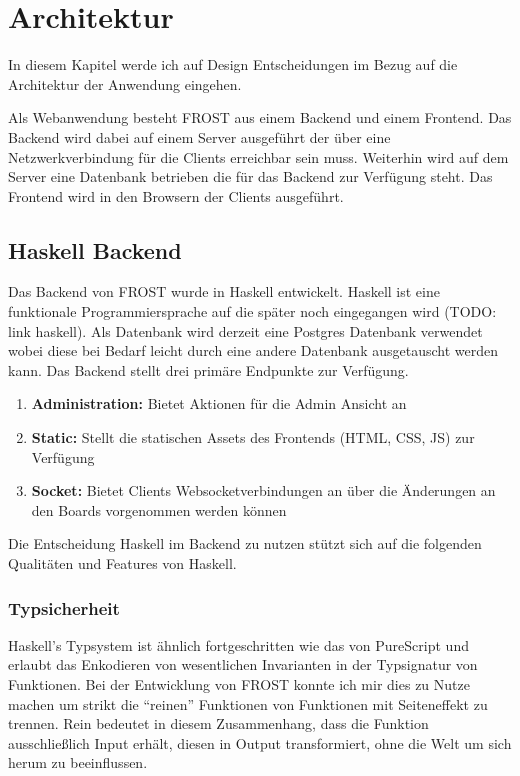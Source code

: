 \chapter{Architektur}
\label{sec:architektur}
In diesem Kapitel werde ich auf Design Entscheidungen im Bezug auf die
Architektur der Anwendung eingehen.

Als Webanwendung besteht FROST aus einem Backend und einem Frontend. Das Backend
wird dabei auf einem Server ausgeführt der über eine Netzwerkverbindung für die
Clients erreichbar sein muss. Weiterhin wird auf dem Server eine Datenbank
betrieben die für das Backend zur Verfügung steht. Das Frontend wird in den
Browsern der Clients ausgeführt.

\section{Haskell Backend}
\label{sec:backend}
Das Backend von FROST wurde in Haskell entwickelt. Haskell ist eine funktionale
Programmiersprache auf die später noch eingegangen wird (TODO: link haskell).
Als Datenbank wird derzeit eine Postgres Datenbank verwendet wobei diese bei
Bedarf leicht durch eine andere Datenbank ausgetauscht werden kann. Das Backend
stellt drei primäre Endpunkte zur Verfügung.

\begin{enumerate}
\item \textbf{Administration:} Bietet Aktionen für die Admin Ansicht an
\item \textbf{Static:} Stellt die statischen Assets des Frontends (HTML, CSS, JS)
  zur Verfügung
\item \textbf{Socket:} Bietet Clients Websocketverbindungen an über die
  Änderungen an den Boards vorgenommen werden können
\end{enumerate}

Die Entscheidung Haskell im Backend zu nutzen stützt sich auf die folgenden
Qualitäten und Features von Haskell.

\subsection*{Typsicherheit}
Haskell's Typsystem ist ähnlich fortgeschritten wie das von PureScript und
erlaubt das Enkodieren von wesentlichen Invarianten in der Typsignatur von
Funktionen. Bei der Entwicklung von FROST konnte ich mir dies zu Nutze machen um
strikt die ``reinen'' Funktionen von Funktionen mit Seiteneffekt zu trennen. Rein
bedeutet in diesem Zusammenhang, dass die Funktion ausschließlich Input erhält,
diesen in Output transformiert, ohne die Welt um sich herum zu beeinflussen.

